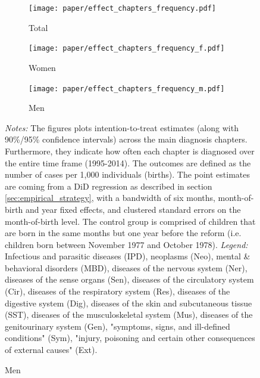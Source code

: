 \documentclass[11pt, a4paper,draft]{article} %
\begin{document}
\begin{landscape}
	\vspace*{\fill}
	\begin{figure}[H]\centering
		\caption{Intention-to-treat effects across \textbf{main diagnosis chapters}}\label{fig: DD_across_main chapters}
		\begin{subfigure}[h]{0.31\linewidth}\centering\caption{Total}
			\texttt{[image: paper/effect\_chapters\_frequency.pdf]}
		\end{subfigure}
		\begin{subfigure}[h]{0.31\linewidth}\centering\caption{Women}
			\texttt{[image: paper/effect\_chapters\_frequency\_f.pdf]}
		\end{subfigure}
		\begin{subfigure}[h]{0.31\linewidth}\centering\caption{Men}
			\texttt{[image: paper/effect\_chapters\_frequency\_m.pdf]}
		\end{subfigure}
		\scriptsize
		\begin{minipage}{\linewidth}
			\emph{Notes:} The figures plots intention-to-treat estimates (along with 90\%/95\% confidence intervals) across the main diagnosis chapters. Furthermore, they indicate how often each chapter is diagnosed over the entire time frame (1995-2014). The outcomes are defined as the number of cases per 1,000 individuals (births). The point estimates are coming from a DiD regression as described in section \ref{sec:empirical_strategy}, with a bandwidth of six months, month-of-birth and year fixed effects, and clustered standard errors on the month-of-birth level. The control group is comprised of children	that are born in the same months but one year before the reform (i.e. children born between November 1977 and October 1978). \newline
			\emph{Legend:} Infectious and parasitic diseases (IPD), neoplasms (Neo), mental \& behavioral disorders (MBD), diseases of the nervous system (Ner), diseases of the sense organs (Sen), diseases of the circulatory system (Cir), diseases of the respiratory system (Res), diseases of the digestive system (Dig), diseases of the skin and subcutaneous tissue (SST), diseases of the musculoskeletal system (Mus), diseases of the genitourinary system (Gen), "symptoms, signs, and ill-defined conditions" (Sym), "injury, poisoning and certain other consequences of external causes" (Ext).
			
		\end{minipage}
	\end{figure}
	\vspace*{\fill}\clearpage
\end{landscape}
\end{document}
